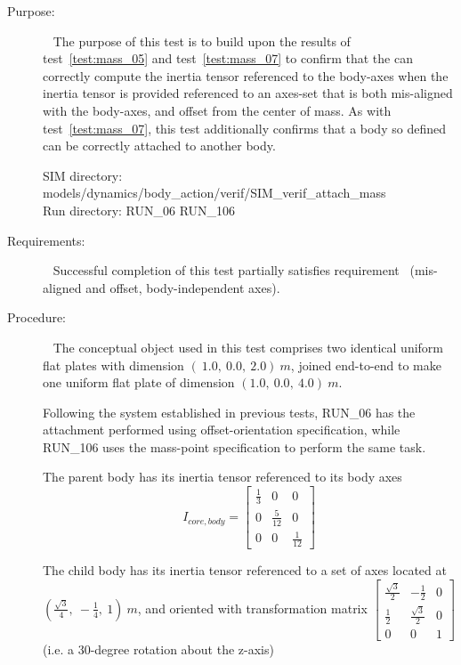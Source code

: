 \label{test:mass_06}
\begin{description}
\item[Purpose:] \ \newline
The purpose of this test is to build upon the results of
test~\ref{test:mass_05} and test~\ref{test:mass_07} to confirm that the
\ModelDesc can correctly compute the inertia tensor referenced to the
body-axes
when the inertia tensor is provided referenced to an axes-set that is both
mis-aligned with the
body-axes, and offset from the center of mass.  As with
test~\ref{test:mass_07}, this test
additionally confirms that a body so defined can be correctly attached to
another body.

SIM directory: models/dynamics/body\_action/verif/SIM\_verif\_attach\_mass\\
Run directory: RUN\_06 RUN\_106


\item[Requirements:] \ \newline
Successful completion of this test partially satisfies
requirement~ (mis-aligned and offset,
body-independent axes).


\item[Procedure:]\ \newline
The conceptual object used in this test comprises two identical uniform flat
plates with dimension $(~1.0, ~0.0, ~2.0) ~m$, joined end-to-end to make one
uniform flat plate of dimension $(1.0, ~0.0, ~4.0) ~m$.

Following the system established in previous tests, RUN\_06 has the attachment
performed using offset-orientation specification, while RUN\_106 uses the
mass-point specification to perform the same task.

The parent body has its inertia tensor referenced to its body axes
\begin{equation*}
I_{core, body} =
   \begin{bmatrix} \frac{1}{3} & 0   & 0  \\
                   0   & \frac{5}{12} & 0   \\
                    0  & 0   & \frac{1}{12}
   \end{bmatrix}
\end{equation*}

The child body has its inertia tensor referenced to a set of axes located at
$(\frac{\sqrt{3}}{4}, ~-\frac{1}{4}, ~1)~m$, and oriented with transformation
matrix
$\begin{bmatrix} \frac{\sqrt{3}}{2} & -\frac{1}{2}   & 0  \\
                   \frac{1}{2}   & \frac{\sqrt{3}}{2} & 0  \\
                    0  & 0   & 1
   \end{bmatrix}
$
(i.e. a 30-degree rotation about the z-axis)


\end{description}
